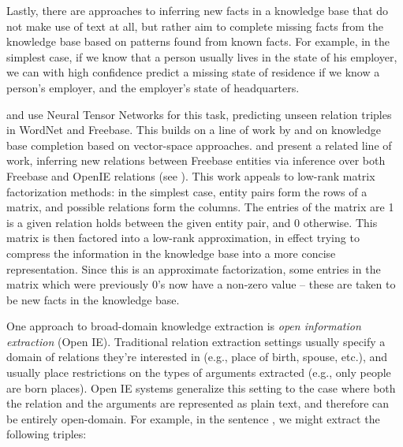 Lastly, there are approaches to inferring new facts in a knowledge base that do not
  make use of text at all, but rather aim to complete missing facts from the knowledge
  base based on patterns found from known facts.
For example, in the simplest case, if we know that a person usually lives in the state 
  of his employer, we can with high confidence predict a missing state of residence if
  we know a person's employer, and the employer's state of headquarters.

 and 
  use Neural Tensor Networks for this task, predicting unseen relation triples in
  WordNet and Freebase.
This builds on a line of work by
   and
   on knowledge base completion based on vector-space
  approaches.
 and 
  present a related line of work, inferring new relations between
  Freebase entities via inference over both Freebase and
  OpenIE relations (see ).
This work appeals to low-rank matrix factorization methods:
  in the simplest case, entity pairs form the rows of a matrix, and possible relations
  form the columns.
The entries of the matrix are 1 is a given relation holds between the given entity pair,
  and 0 otherwise.
This matrix is then factored into a low-rank approximation, in effect trying to compress
  the information in the knowledge base into a more concise representation.
Since this is an approximate factorization, some entries in the matrix which were previously
  0's now have a non-zero value -- these are taken to be new facts in the knowledge base.



%
%
One approach to broad-domain knowledge extraction is \textit{open information extraction} (Open IE).
Traditional relation extraction settings usually specify a domain of relations they're
  interested in (e.g., place of birth, spouse, etc.), and usually place restrictions on the
  types of arguments extracted (e.g., only people are born places).
Open IE systems generalize this setting to the case where both the relation and the arguments
  are represented as plain text, and therefore can be entirely open-domain.
For example, in the sentence , we might extract
  the following triples:

